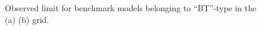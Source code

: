\begin{figure}[h]
  \centering
    \caption{
    Observed limit for benchmark models belonging to ``BT''-type in the (a) \DMtw (b) \DMth grid.
      \label{fig::Result::combLimit::BT2} }
\end{figure}




